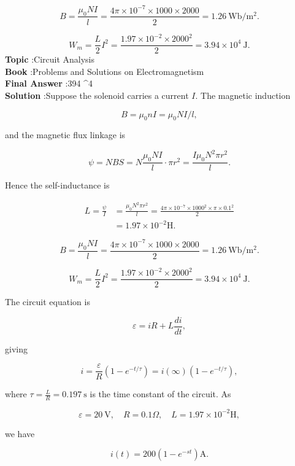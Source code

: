 \documentclass[10pt]{article}
\begin{document}
$$
B=\frac{\mu_{0} N I}{l}=\frac{4 \pi \times 10^{-7} \times 1000 \times 2000}{2}=1.26 \mathrm{~Wb} / \mathrm{m}^{2} .
$$



$$
W_{m}=\frac{L}{2} I^{2}=\frac{1.97 \times 10^{-2} \times 2000^{2}}{2}=3.94 \times 10^{4} \mathrm{~J} .
$$
\textbf{Topic} :Circuit Analysis\\
\textbf{Book} :Problems and Solutions on Electromagnetism\\
\textbf{Final Answer} :394 ^{4} \\


\textbf{Solution} :Suppose the solenoid carries a current $I$. The magnetic induction

$$
B=\mu_{0} n I=\mu_{0} N I / l,
$$

and the magnetic flux linkage is

$$
\psi=N B S=N \frac{\mu_{0} N I}{l} \cdot \pi r^{2}=\frac{I \mu_{0} N^{2} \pi r^{2}}{l} .
$$

Hence the self-inductance is

$$
\begin{aligned}
L=\frac{\psi}{I} &=\frac{\mu_{0} N^{2} \pi r^{2}}{l}=\frac{4 \pi \times 10^{-7} \times 1000^{2} \times \pi \times 0.1^{2}}{2} \\
&=1.97 \times 10^{-2} \mathrm{H} .
\end{aligned}
$$



$$
B=\frac{\mu_{0} N I}{l}=\frac{4 \pi \times 10^{-7} \times 1000 \times 2000}{2}=1.26 \mathrm{~Wb} / \mathrm{m}^{2} .
$$



$$
W_{m}=\frac{L}{2} I^{2}=\frac{1.97 \times 10^{-2} \times 2000^{2}}{2}=3.94 \times 10^{4} \mathrm{~J} .
$$

 The circuit equation is

$$
\varepsilon=i R+L \frac{d i}{d t},
$$

giving

$$
i=\frac{\varepsilon}{R}\left(1-e^{-t / \tau}\right)=i(\infty)\left(1-e^{-t / \tau}\right),
$$

where $\tau=\frac{L}{R}=0.197 \mathrm{~s}$ is the time constant of the circuit. As

$$
\varepsilon=20 \mathrm{~V}, \quad R=0.1 \Omega, \quad L=1.97 \times 10^{-2} \mathrm{H},
$$

we have

$$
i(t)=200\left(1-e^{-s t}\right) \mathrm{A} .
$$
\end{document}
